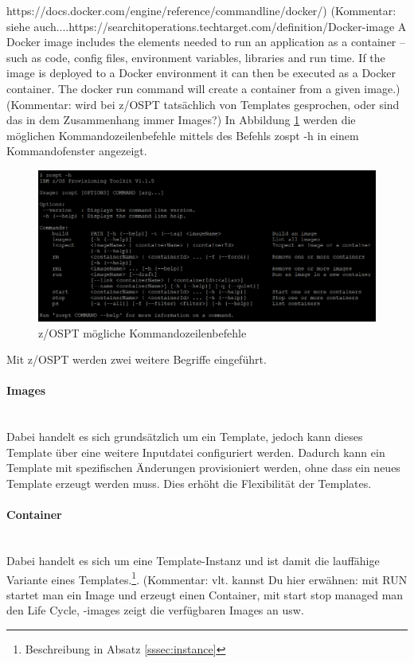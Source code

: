 https://docs.docker.com/engine/reference/commandline/docker/) (Kommentar: siehe auch....https://searchitoperations.techtarget.com/definition/Docker-image 
A Docker image includes the elements needed to run an application as a container -- such as code, config files, environment variables, libraries and run time. If the image is deployed to a Docker environment it can then be executed as a Docker container. The docker run command will create a container from a given image.)
(Kommentar: wird bei z/OSPT tatsächlich von Templates gesprochen, oder sind das in dem Zusammenhang immer Images?)
In Abbildung \ref{fig:zospt_help} werden die möglichen Kommandozeilenbefehle mittels des Befehls \glqq zospt -h\grqq{} in einem Kommandofenster angezeigt. 
\begin{figure}[h]
	\centering
	\includegraphics[width=\textwidth]{figures/zospt_help_putty.png}
	\caption{z/OSPT mögliche Kommandozeilenbefehle}
	\label{fig:zospt_help}
\end{figure}

Mit z/OSPT werden zwei weitere Begriffe eingeführt.\\
\paragraph{\glqq Images\grqq}~\\
Dabei handelt es sich grundsätzlich um ein Template, jedoch kann dieses Template über eine weitere Inputdatei configuriert werden.
Dadurch kann ein Template mit spezifischen Änderungen provisioniert werden, ohne dass ein neues Template erzeugt werden muss.
Dies erhöht die Flexibilität der Templates. 

\paragraph{\glqq Container\grqq}~\\
Dabei handelt es sich um eine Template-Instanz und ist damit die lauffähige Variante eines Templates.\footnote{Beschreibung in Absatz \ref{sssec:instance}}.
(Kommentar: vlt. kannst Du hier erwähnen: mit RUN startet man ein Image und erzeugt einen Container, mit start stop managed man den Life Cycle, -images zeigt die verfügbaren Images an usw. 
\cite{IBM.2019b}

